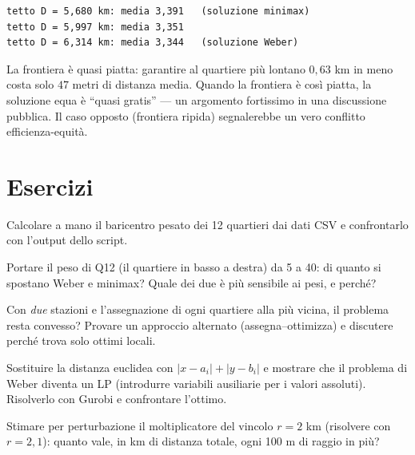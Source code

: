 \begin{lstlisting}[style=output]
tetto D = 5,680 km: media 3,391   (soluzione minimax)
tetto D = 5,997 km: media 3,351
tetto D = 6,314 km: media 3,344   (soluzione Weber)
\end{lstlisting}

\begin{spiegazione}
La frontiera è quasi piatta: garantire al quartiere più lontano $0{,}63$ km in meno
costa solo $47$ metri di distanza media. Quando la frontiera è così piatta, la
soluzione equa è ``quasi gratis'' --- un argomento fortissimo in una discussione
pubblica. Il caso opposto (frontiera ripida) segnalerebbe un vero conflitto
efficienza-equità.
\end{spiegazione}

\section{Esercizi}

\begin{esercizio}[verifica]
Calcolare a mano il baricentro pesato dei 12 quartieri dai dati CSV e confrontarlo
con l'output dello script.
\end{esercizio}

\begin{esercizio}
Portare il peso di Q12 (il quartiere in basso a destra) da 5 a 40: di quanto si
spostano Weber e minimax? Quale dei due è più sensibile ai pesi, e perché?
\end{esercizio}

\begin{esercizio}
Con \emph{due} stazioni e l'assegnazione di ogni quartiere alla più vicina, il
problema resta convesso? Provare un approccio alternato (assegna--ottimizza) e
discutere perché trova solo ottimi locali.
\end{esercizio}

\begin{esercizio}
Sostituire la distanza euclidea con $|x - a_i| + |y - b_i|$ e mostrare che il
problema di Weber diventa un LP (introdurre variabili ausiliarie per i valori
assoluti). Risolverlo con Gurobi e confrontare l'ottimo.
\end{esercizio}

\begin{esercizio}
Stimare per perturbazione il moltiplicatore del vincolo $r = 2$ km (risolvere con
$r = 2{,}1$): quanto vale, in km di distanza totale, ogni 100 m di raggio in più?
\end{esercizio}
